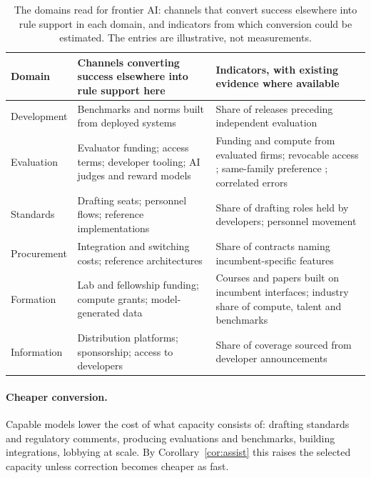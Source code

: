 \documentclass[letterpaper]{article} %
\theoremstyle{definition}
\begin{document}
\begin{table}[t]
\centering
\small
\setlength{\tabcolsep}{4pt}
\begin{tabular}{@{}>{\raggedright\arraybackslash}p{1.7cm}>{\raggedright\arraybackslash}p{5.5cm}>{\raggedright\arraybackslash}p{9.6cm}@{}}
\toprule
Domain & Channels converting success elsewhere into rule support here & Indicators, with existing evidence where available \\
\midrule
Development & Benchmarks and norms built from deployed systems & Share of releases preceding independent evaluation \\
Evaluation & Evaluator funding; access terms; developer tooling; AI judges and reward models & Funding and compute from evaluated firms; revocable access \citep{longpre2024}; same-family preference \citep{panickssery2024,awuni2026}; correlated errors \citep{kim2025,goel2025} \\
Standards & Drafting seats; personnel flows; reference implementations & Share of drafting roles held by developers; personnel movement \citep{buthe2011} \\
Procurement & Integration and switching costs; reference architectures & Share of contracts naming incumbent-specific features \\
Formation & Lab and fellowship funding; compute grants; model-generated data & Courses and papers built on incumbent interfaces; industry share of compute, talent and benchmarks \citep{ahmed2023} \\
Information & Distribution platforms; sponsorship; access to developers & Share of coverage sourced from developer announcements \\
\bottomrule
\end{tabular}
\caption{The domains read for frontier AI: channels that convert success elsewhere into rule support in each domain, and indicators from which conversion could be estimated. The entries are illustrative, not measurements.}
\label{tab:domains}
\end{table}

\paragraph{Cheaper conversion.} Capable models lower the cost of what capacity consists of: drafting standards and regulatory comments, producing evaluations and benchmarks, building integrations, lobbying at scale. By Corollary~\ref{cor:assist} this raises the selected capacity unless correction becomes cheaper as fast.
\end{document}
